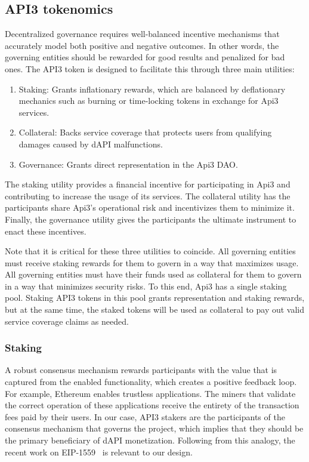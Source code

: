 \documentclass[11pt]{article}
\begin{document}
\subsection{API3 tokenomics}
\label{sec:api3-tokenomics}

Decentralized governance requires well-balanced incentive mechanisms that accurately model both positive and negative outcomes.
In other words, the governing entities should be rewarded for good results and penalized for bad ones.
The API3 token is designed to facilitate this through three main utilities:

\begin{enumerate}
    \item Staking: Grants inflationary rewards, which are balanced by deflationary mechanics such as burning or time-locking tokens in exchange for Api3 services.
    \item Collateral: Backs service coverage that protects users from qualifying damages caused by dAPI malfunctions.
    \item Governance: Grants direct representation in the Api3 DAO.
\end{enumerate}

The staking utility provides a financial incentive for participating in Api3 and contributing to increase the usage of its services.
The collateral utility has the participants share Api3’s operational risk and incentivizes them to minimize it.
Finally, the governance utility gives the participants the ultimate instrument to enact these incentives.

Note that it is critical for these three utilities to coincide.
All governing entities must receive staking rewards for them to govern in a way that maximizes usage.
All governing entities must have their funds used as collateral for them to govern in a way that minimizes security risks.
To this end, Api3 has a single staking pool.
Staking API3 tokens in this pool grants representation and staking rewards, but at the same time, the staked tokens will be used as collateral to pay out valid service coverage claims as needed.

\subsubsection{Staking}
\label{sec:staking}

A robust consensus mechanism rewards participants with the value that is captured from the enabled functionality, which creates a positive feedback loop.
For example, Ethereum enables trustless applications.
The miners that validate the correct operation of these applications receive the entirety of the transaction fees paid by their users.
In our case, API3 stakers are the participants of the consensus mechanism that governs the project, which implies that they should be the primary beneficiary of dAPI monetization.
Following from this analogy, the recent work on EIP-1559~\cite{eip1559} is relevant to our design.
\end{document}

